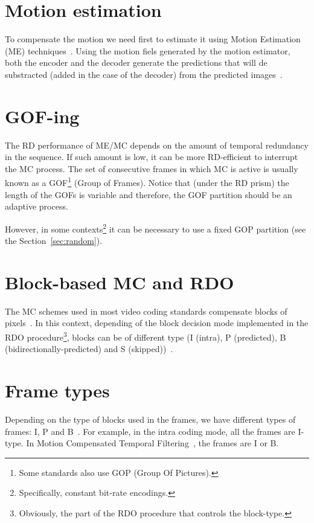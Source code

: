 
\section{Motion estimation}

To compensate the motion we need first to estimate it using Motion
Estimation (ME) techniques~\cite{vruiz__ME}. Using the motion fiels
generated by the motion estimator, both the encoder and the decoder
generate the predictions that will de substracted (added in the case
of the decoder) from the predicted images~\cite{vruiz__MC}.


\section{GOF-ing}

The RD performance of ME/MC depends on the amount of temporal
redundancy in the sequence. If such amount is low, it can be more
RD-efficient to interrupt the MC process. The set of consecutive
frames in which MC is active is usually known as a GOF\footnote{Some
  standards also use GOP (Group Of Pictures).} (Group of
Frames). Notice that (under the RD prism) the length of the GOFs is
variable and therefore, the GOF partition should be an adaptive
process.

However, in some contexts\footnote{Specifically, constant bit-rate
  encodings.} it can be necessary to use a fixed GOP partition (see
the Section~\ref{sec:random}).

\section{Block-based MC and RDO}

The MC schemes used in most video coding standards compensate blocks
of pixels~\cite{vruiz__ME}. In this context, depending of the block
decision mode implemented in the RDO procedure\footnote{Obviously, the
  part of the RDO procedure that controls the block-type.}, blocks can
be of different type (I (intra), P (predicted), B
(bidirectionally-predicted) and S (skipped))~\cite{vruiz__MC}.

\section{Frame types}

Depending on the type of blocks used in the frames, we have different
types of frames: I, P and B~\cite{vruiz__MC}. For example, in the
intra coding mode, all the frames are I-type. In Motion Compensated
Temporal Filtering~\cite{vruiz__MCTF}, the frames are I or B.

